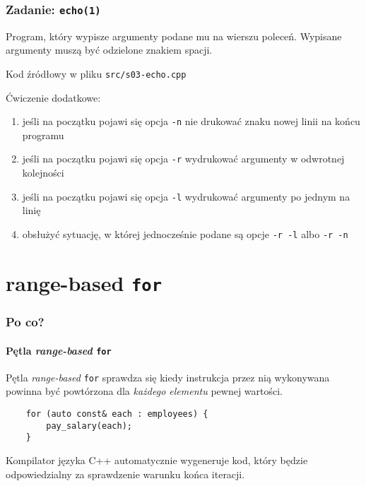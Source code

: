 \documentclass[aspectratio=169]{beamer}
\begin{document}
\begin{frame}[fragile]
    \frametitle{Zadanie: {\tt echo(1)}}
    \label{lecture_exercise_4}

    Program, który wypisze argumenty podane mu na wierszu poleceń. Wypisane
    argumenty muszą być odzielone znakiem spacji.

    Kod źródłowy w pliku {\tt src/s03-echo.cpp}

    \vspace{1em}

    {\small
    Ćwiczenie dodatkowe:
    \begin{enumerate}
        \item jeśli na początku pojawi się opcja {\tt -n} nie drukować znaku
            nowej linii na końcu programu
        \item jeśli na początku pojawi się opcja {\tt -r} wydrukować
            argumenty w odwrotnej kolejności
        \item jeśli na początku pojawi się opcja {\tt -l} wydrukować argumenty
            po jednym na linię
        \item obsłużyć sytuację, w której jednocześnie podane są opcje {\tt -r
            -l} albo {\tt -r -n}
    \end{enumerate}}
\end{frame}

\section{range-based {\tt for}}

\begin{frame}[fragile]
    \frametitle{Po co?}
    \framesubtitle{Pętla \emph{range-based} {\tt for}}

    Pętla \emph{range-based} {\tt for} sprawdza się kiedy instrukcja przez nią
    wykonywana powinna być powtórzona dla \emph{każdego elementu} pewnej
    wartości.

    \begin{lstlisting}
    for (auto const& each : employees) {
        pay_salary(each);
    }
    \end{lstlisting}

    Kompilator języka C++ automatycznie wygeneruje kod, który będzie
    odpowiedzialny za sprawdzenie warunku końca iteracji.
\end{frame}
\end{document}
